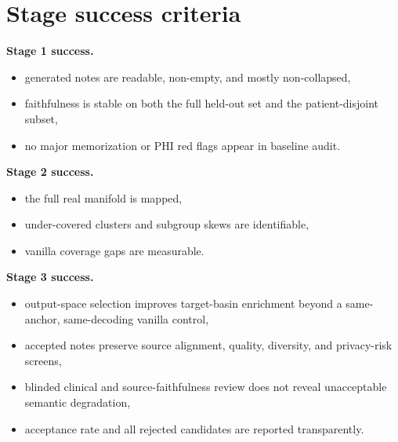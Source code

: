 \documentclass[11pt]{article}
\begin{document}
\section{Stage success criteria}

\textbf{Stage 1 success.}
\begin{itemize}[nosep]
  \item generated notes are readable, non-empty, and mostly non-collapsed,
  \item faithfulness is stable on both the full held-out set and the patient-disjoint subset,
  \item no major memorization or PHI red flags appear in baseline audit.
\end{itemize}

\textbf{Stage 2 success.}
\begin{itemize}[nosep]
  \item the full real manifold is mapped,
  \item under-covered clusters and subgroup skews are identifiable,
  \item vanilla coverage gaps are measurable.
\end{itemize}

\textbf{Stage 3 success.}
\begin{itemize}[nosep]
  \item output-space selection improves target-basin enrichment beyond a same-anchor, same-decoding vanilla control,
  \item accepted notes preserve source alignment, quality, diversity, and privacy-risk screens,
  \item blinded clinical and source-faithfulness review does not reveal unacceptable semantic degradation,
  \item acceptance rate and all rejected candidates are reported transparently.
\end{itemize}
\end{document}
